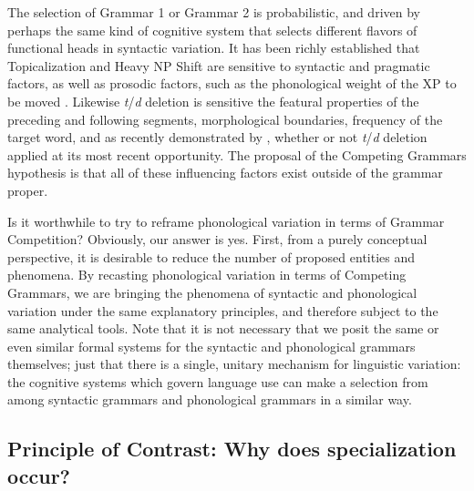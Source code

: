 The selection of Grammar 1 or Grammar 2 is probabilistic, and driven by perhaps the same kind of cognitive system that selects different flavors of functional heads in syntactic variation.
It has been richly established that Topicalization and Heavy NP Shift are sensitive to syntactic and pragmatic factors, as well as prosodic factors, such as the phonological weight of the XP to be moved \citep[e.g.][]{arnoldetal2000, speyer2008, speyer2010, wallenberg2012}. %
Likewise {\sl t}/{\sl d} deletion is sensitive the featural properties of the preceding and following segments, morphological boundaries, frequency of the target word, and as recently demonstrated by \citet{MacKenzie.Tamminga2012}, whether or not {\sl t}/{\sl d} deletion applied at its most recent opportunity.
The proposal of the Competing Grammars hypothesis is that all of these influencing factors exist outside of the grammar proper.

Is it worthwhile to try to reframe phonological variation in terms of Grammar Competition?
Obviously, our answer is yes.
First, from a purely conceptual perspective, it is desirable to reduce the number of proposed entities and phenomena.
By recasting phonological variation in terms of Competing Grammars, we are bringing the phenomena of syntactic and phonological variation under the same explanatory principles, and therefore subject to the same analytical tools.
Note that it is not necessary that we posit the same or even similar formal systems for the syntactic and phonological grammars themselves; just that there is a single, unitary mechanism for linguistic variation: the cognitive systems which govern language use can make a selection from among syntactic grammars and phonological grammars in a similar way.






\subsection{Principle of Contrast: Why does specialization occur?}

